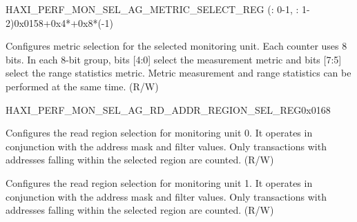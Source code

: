 \begin{register}{H}{AXI\_PERF\_MON\_SEL\_AG\_METRIC\_SELECT\_REG (: 0-1, : 1-2)}{0x0158+0x4*+0x8*(-1)}\label{regdesc:AXIPERFMONSELAGNMETRICSELECTMREG}
%
\regnewline%
\begin{regdesc}\begin{reglist}
\label{fielddesc:AXIPERFMONSELAGNMETRICSELECTM}\item [AXI\_PERF\_MON\_SEL\_AG\regindex{n}\_METRIC\_SELECT\regindex{m} (\regindex{n}: 0-1, \regindex{m}: 1-2)] Configures metric selection for the selected monitoring unit. Each counter uses 8 bits. In each 8-bit group, bits [4:0] select the measurement metric and bits [7:5] select the range statistics metric. Metric measurement and range statistics can be performed at the same time. (R/W)
\end{reglist}\end{regdesc}
\end{register}


\begin{register}{H}{AXI\_PERF\_MON\_SEL\_AG\_RD\_ADDR\_REGION\_SEL\_REG}{0x0168}\label{regdesc:AXIPERFMONSELAGRDADDRREGIONSELREG}
%
%
%
\regnewline%
\begin{regdesc}\begin{reglist}
\label{fielddesc:AXIPERFMONSELAG0RDADDRREGIONSEL}\item [AXI\_PERF\_MON\_SEL\_AG0\_RD\_ADDR\_REGION\_SEL] Configures the read region selection for monitoring unit 0. It operates in conjunction with the address mask and filter values. Only transactions with addresses falling within the selected region are counted. (R/W)
\label{fielddesc:AXIPERFMONSELAG1RDADDRREGIONSEL}\item [AXI\_PERF\_MON\_SEL\_AG1\_RD\_ADDR\_REGION\_SEL] Configures the read region selection for monitoring unit 1. It operates in conjunction with the address mask and filter values. Only transactions with addresses falling within the selected region are counted. (R/W)
\end{reglist}\end{regdesc}
\end{register}


